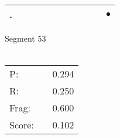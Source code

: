 \documentclass[landscape]{article}
\newcommand{\ssp}{\hspace{2pt}}
\newcommand{\mex}{\cellcolor{g}$\bullet$}
\begin{document}
\begin{tabular}{|l|p{10pt}|p{10pt}|p{10pt}|p{10pt}|p{10pt}|p{10pt}|p{10pt}|p{10pt}|p{10pt}|p{10pt}|}
\hline
\ssp \cellcolor{ref9}. \ssp&\hspace{2pt}&\hspace{2pt}&\hspace{2pt}&\hspace{2pt}&\hspace{2pt}&\hspace{2pt}&\hspace{2pt}&\hspace{2pt}&\hspace{2pt}&\hspace{2pt}\mex\\
\hline
\end{tabular}

\vspace{6pt}
\noindent Segment 53\\\\
\noindent\begin{tabular}{lm{12pt}r}
\hline
P:&&0.294\\
R:&&0.250\\
Frag:&&0.600\\
Score:&&0.102\\
\end{tabular}

\newpage
\end{document}
